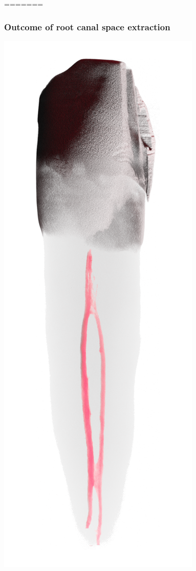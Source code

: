 \begin{frame}
\begin{frame}
%
=======
	\frametitle{Outcome of root canal space extraction}%
	\renewcommand{\imheight}{0.618\paperheight}%
		\includegraphics[height=\imageheight]{./images/rcs/Tooth0452}%

\end{frame}
\end{frame}
